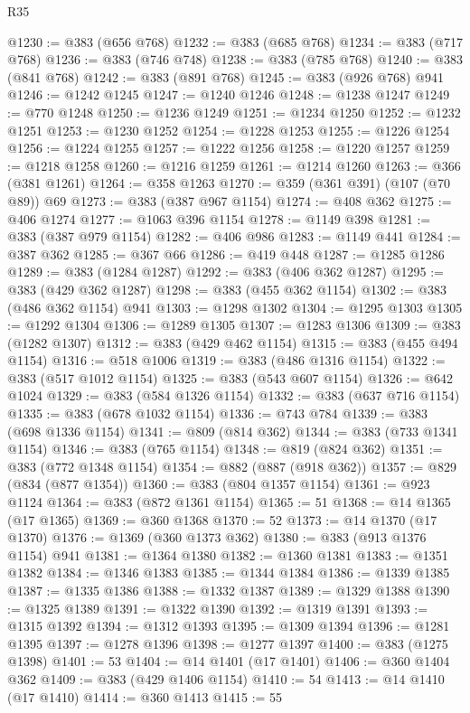 \begin{lexlean}{R35}
\begin{coremodule}
{{{{{{{{{{{{{{{{{{{{{{{{{{{{{{{{{{{{{{{{{{{{{{{{{{{{@1230 := @383 (@656 @768)
@1232 := @383 (@685 @768)
@1234 := @383 (@717 @768)
@1236 := @383 (@746 @748)
@1238 := @383 (@785 @768)
@1240 := @383 (@841 @768)
@1242 := @383 (@891 @768)
@1245 := @383 (@926 @768) @941
@1246 := @1242 @1245
@1247 := @1240 @1246
@1248 := @1238 @1247
@1249 := @770 @1248
@1250 := @1236 @1249
@1251 := @1234 @1250
@1252 := @1232 @1251
@1253 := @1230 @1252
@1254 := @1228 @1253
@1255 := @1226 @1254
@1256 := @1224 @1255
@1257 := @1222 @1256
@1258 := @1220 @1257
@1259 := @1218 @1258
@1260 := @1216 @1259
@1261 := @1214 @1260
@1263 := @366 (@381 @1261)
@1264 := @358 @1263
@1270 := @359 (@361 @391) (@107 (@70 @89)) @69
@1273 := @383 (@387 @967 @1154)
@1274 := @408 @362
@1275 := @406 @1274
@1277 := @1063 @396 @1154
@1278 := @1149 @398
@1281 := @383 (@387 @979 @1154)
@1282 := @406 @986
@1283 := @1149 @441
@1284 := @387 @362
@1285 := @367 @66
@1286 := @419 @448
@1287 := @1285 @1286
@1289 := @383 (@1284 @1287)
@1292 := @383 (@406 @362 @1287)
@1295 := @383 (@429 @362 @1287)
@1298 := @383 (@455 @362 @1154)
@1302 := @383 (@486 @362 @1154) @941
@1303 := @1298 @1302
@1304 := @1295 @1303
@1305 := @1292 @1304
@1306 := @1289 @1305
@1307 := @1283 @1306
@1309 := @383 (@1282 @1307)
@1312 := @383 (@429 @462 @1154)
@1315 := @383 (@455 @494 @1154)
@1316 := @518 @1006
@1319 := @383 (@486 @1316 @1154)
@1322 := @383 (@517 @1012 @1154)
@1325 := @383 (@543 @607 @1154)
@1326 := @642 @1024
@1329 := @383 (@584 @1326 @1154)
@1332 := @383 (@637 @716 @1154)
@1335 := @383 (@678 @1032 @1154)
@1336 := @743 @784
@1339 := @383 (@698 @1336 @1154)
@1341 := @809 (@814 @362)
@1344 := @383 (@733 @1341 @1154)
@1346 := @383 (@765 @1154)
@1348 := @819 (@824 @362)
@1351 := @383 (@772 @1348 @1154)
@1354 := @882 (@887 (@918 @362))
@1357 := @829 (@834 (@877 @1354))
@1360 := @383 (@804 @1357 @1154)
@1361 := @923 @1124
@1364 := @383 (@872 @1361 @1154)
@1365 := 51
@1368 := @14 @1365 (@17 @1365)
@1369 := @360 @1368
@1370 := 52
@1373 := @14 @1370 (@17 @1370)
@1376 := @1369 (@360 @1373 @362)
@1380 := @383 (@913 @1376 @1154) @941
@1381 := @1364 @1380
@1382 := @1360 @1381
@1383 := @1351 @1382
@1384 := @1346 @1383
@1385 := @1344 @1384
@1386 := @1339 @1385
@1387 := @1335 @1386
@1388 := @1332 @1387
@1389 := @1329 @1388
@1390 := @1325 @1389
@1391 := @1322 @1390
@1392 := @1319 @1391
@1393 := @1315 @1392
@1394 := @1312 @1393
@1395 := @1309 @1394
@1396 := @1281 @1395
@1397 := @1278 @1396
@1398 := @1277 @1397
@1400 := @383 (@1275 @1398)
@1401 := 53
@1404 := @14 @1401 (@17 @1401)
@1406 := @360 @1404 @362
@1409 := @383 (@429 @1406 @1154)
@1410 := 54
@1413 := @14 @1410 (@17 @1410)
@1414 := @360 @1413
@1415 := 55
}}}}}}}}}}}}}}}}}}}}}}}}}}}}}}}}}}}}}}}}}}}}}}}}}}}}
\end{coremodule}
\end{lexlean}
